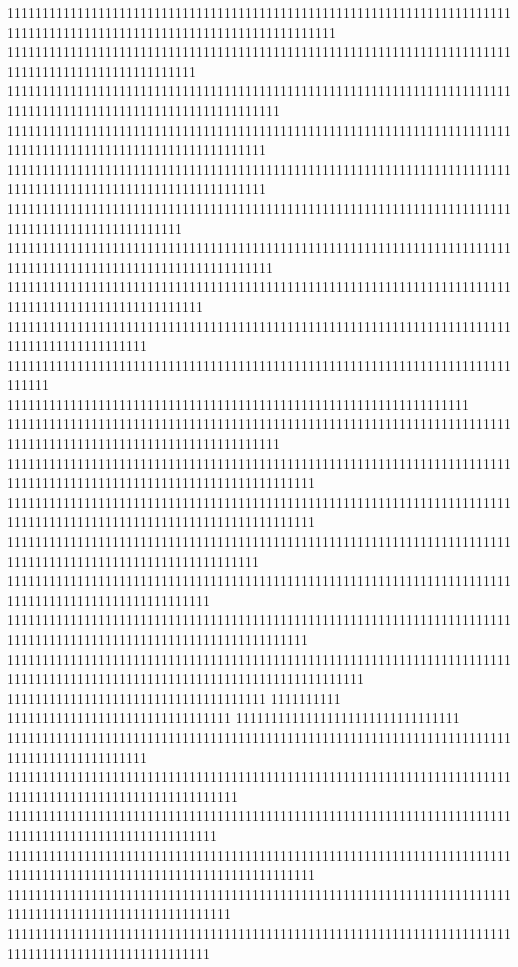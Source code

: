 11111111111111111111111111111111111111111111111111111111111111111111111111111111111111111111111111111111111111111111111
111111111111111111111111111111111111111111111111111111111111111111111111111111111111111111111111111
111111111111111111111111111111111111111111111111111111111111111111111111111111111111111111111111111111111111111
1111111111111111111111111111111111111111111111111111111111111111111111111111111111111111111111111111111111111
1111111111111111111111111111111111111111111111111111111111111111111111111111111111111111111111111111111111111
1111111111111111111111111111111111111111111111111111111111111111111111111111111111111111111111111
11111111111111111111111111111111111111111111111111111111111111111111111111111111111111111111111111111111111111
1111111111111111111111111111111111111111111111111111111111111111111111111111111111111111111111111111
11111111111111111111111111111111111111111111111111111111111111111111111111111111111111111111
111111111111111111111111111111111111111111111111111111111111111111111111111111
111111111111111111111111111111111111111111111111111111111111111111
111111111111111111111111111111111111111111111111111111111111111111111111111111111111111111111111111111111111111
11111111111111111111111111111111111111111111111111111111111111111111111111111111111111111111111111111111111111111111
11111111111111111111111111111111111111111111111111111111111111111111111111111111111111111111111111111111111111111111
111111111111111111111111111111111111111111111111111111111111111111111111111111111111111111111111111111111111
11111111111111111111111111111111111111111111111111111111111111111111111111111111111111111111111111111
1111111111111111111111111111111111111111111111111111111111111111111111111111111111111111111111111111111111111111111
111111111111111111111111111111111111111111111111111111111111111111111111111111111111111111111111111111111111111111111111111
1111111111111111111111111111111111111
1111111111
11111111111111111111111111111111
11111111111111111111111111111111
11111111111111111111111111111111111111111111111111111111111111111111111111111111111111111111
111111111111111111111111111111111111111111111111111111111111111111111111111111111111111111111111111111111
111111111111111111111111111111111111111111111111111111111111111111111111111111111111111111111111111111
11111111111111111111111111111111111111111111111111111111111111111111111111111111111111111111111111111111111111111111
11111111111111111111111111111111111111111111111111111111111111111111111111111111111111111111111111111111
11111111111111111111111111111111111111111111111111111111111111111111111111111111111111111111111111111
